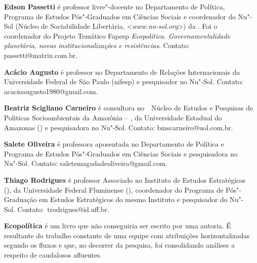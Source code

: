 \textbf{Edson Passetti} é professor livre"-docente no Departamento de Política, Programa de Estudos Pós"-Graduados em Ciências Sociais e coordenador do Nu"-Sol (Núcleo de Sociabilidade Libertária, \textless{}\emph{www.nu-sol.org}\textgreater{}) da . Foi o coordenador do Projeto Temático Fapesp \emph{Ecopolítica. Governamentalidade planetária, novas institucionalizações e resistências}. Contato: passetti@matrix.com.br.

\textbf{Acácio Augusto} é professor no Departamento de Relações Internacionais da Universidade Federal de São Paulo (nifesp) e pesquisador no Nu"-Sol. Contato: acacioaugusto1980@gmail.com.

\textbf{Beatriz Scigliano Carneiro} é consultora no  Núcleo de Estudos e Pesquisas de Politicas Socioambientais da Amazônia -- , da Universidade Estadual do Amazonas () e pesquisadora no Nu"-Sol. Contato: bmscarneiro@uol.com.br.

\textbf{Salete Oliveira} é professora aposentada no Departamento de Política e Programa de Estudos Pós"-Graduados em Ciências Sociais e pesquisadora no Nu"-Sol. Contato: saletemagadadeoliveira@gmail.com.

\textbf{Thiago Rodrigues} é professor Associado no Instituto de Estudos Estratégicos (), da Universidade Federal Fluminense (), coordenador do Programa de Pós"-Graduação em Estudos Estratégicos do mesmo Instituto e pesquisador do Nu"-Sol. Contato: trodrigues@id.uff.br.

\textbf{Ecopolítica} é um livro que não conseguiria ser escrito por uma autoria. É resultante do trabalho constante de uma equipe com atribuições horizontalizadas segundo os fluxos e que, no decorrer da pesquisa, foi consolidando análises a respeito de caudalosos afluentes.






